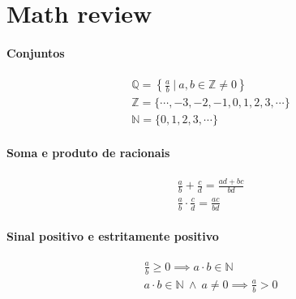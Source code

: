 \documentclass[a4paper, 12pt]{article}
\begin{document}
  \section*{Math review}
  \paragraph*{Conjuntos}
  \begin{gather}
    \mathbb{Q} = \left\{ \frac{a}{b} \ | \ a, b \in \mathbb{Z} \neq 0 \right\} \\
    \mathbb{Z} = \{ \cdots, -3, -2, -1, 0, 1, 2, 3, \cdots \} \\
    \mathbb{N} = \{0,1,2,3,\cdots\}
  \end{gather}
  
  \paragraph*{Soma e produto de racionais}
  \begin{gather}
    \frac{a}{b} + \frac{c}{d} = \frac{ad + bc}{bd} \\
    \frac{a}{b} \cdot \frac{c}{d} = \frac{ac}{bd}
  \end{gather}

  \paragraph*{Sinal positivo e estritamente positivo}
  \begin{gather}
    \frac{a}{b} \geq 0 \implies a \cdot b \in \mathbb{N} \\
    a \cdot b \in \mathbb{N} \ \land \ a \neq 0 \implies \frac{a}{b} > 0
  \end{gather}
\end{document}
